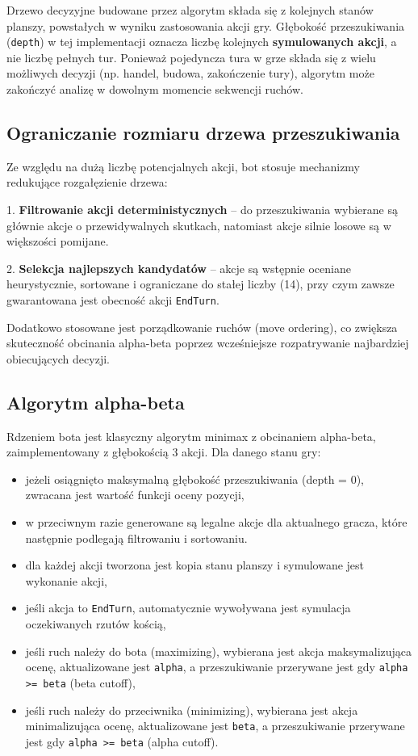 \documentclass[polish,inz,longabstract]{iithesis}
\begin{document}
Drzewo decyzyjne budowane przez algorytm składa się z kolejnych stanów planszy, powstałych w wyniku zastosowania akcji gry. Głębokość przeszukiwania (\texttt{depth}) w tej implementacji oznacza liczbę kolejnych \textbf{symulowanych akcji}, a nie liczbę pełnych tur. Ponieważ pojedyncza tura w grze składa się z wielu możliwych decyzji (np. handel, budowa, zakończenie tury), algorytm może zakończyć analizę w dowolnym momencie sekwencji ruchów.

\subsection{Ograniczanie rozmiaru drzewa przeszukiwania}

Ze względu na dużą liczbę potencjalnych akcji, bot stosuje mechanizmy redukujące rozgałęzienie drzewa:

1. \textbf{Filtrowanie akcji deterministycznych} – do przeszukiwania wybierane są głównie akcje o przewidywalnych skutkach, natomiast akcje silnie losowe są w większości pomijane.

2. \textbf{Selekcja najlepszych kandydatów} – akcje są wstępnie oceniane heurystycznie, sortowane i ograniczane do stałej liczby (14), przy czym zawsze gwarantowana jest obecność akcji \texttt{EndTurn}.

Dodatkowo stosowane jest porządkowanie ruchów (move ordering), co zwiększa skuteczność obcinania alpha-beta poprzez wcześniejsze rozpatrywanie najbardziej obiecujących decyzji.

\subsection{Algorytm alpha-beta}

Rdzeniem bota jest klasyczny algorytm minimax z obcinaniem alpha-beta, zaimplementowany z głębokością 3 akcji. Dla danego stanu gry:

\begin{itemize}
\item jeżeli osiągnięto maksymalną głębokość przeszukiwania (depth = 0), zwracana jest wartość funkcji oceny pozycji,
\item w przeciwnym razie generowane są legalne akcje dla aktualnego gracza, które następnie podlegają filtrowaniu i sortowaniu.
\item dla każdej akcji tworzona jest kopia stanu planszy i symulowane jest wykonanie akcji,
\item jeśli akcja to \texttt{EndTurn}, automatycznie wywoływana jest symulacja oczekiwanych rzutów kością,
\item jeśli ruch należy do bota (maximizing), wybierana jest akcja maksymalizująca ocenę, aktualizowane jest \texttt{alpha}, a przeszukiwanie przerywane jest gdy \newline \texttt{alpha >= beta} (beta cutoff),
\item jeśli ruch należy do przeciwnika (minimizing), wybierana jest akcja minimalizująca ocenę, aktualizowane jest \texttt{beta}, a przeszukiwanie przerywane jest gdy \texttt{alpha >= beta} (alpha cutoff).
\end{itemize}
\end{document}

